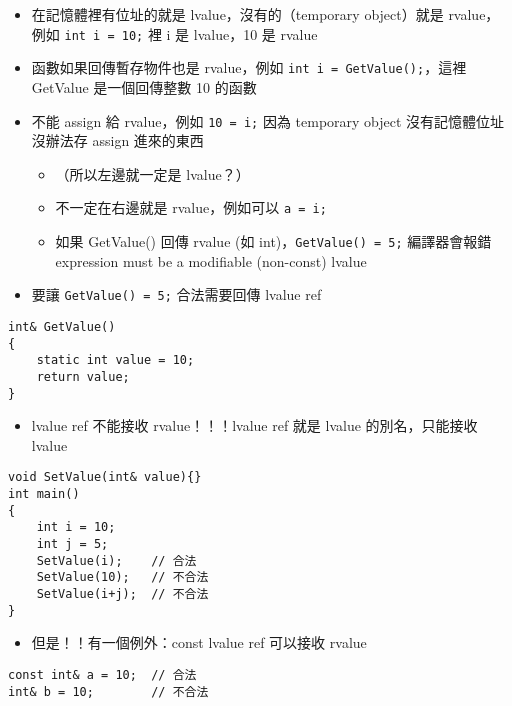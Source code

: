 \documentclass[11pt]{article}
\providecommand{\tightlist}{%
      \setlength{\itemsep}{0pt}\setlength{\parskip}{0pt}}
\begin{document}
\begin{itemize}
\tightlist
\item
  在記憶體裡有位址的就是 lvalue，沒有的（temporary object）就是
  rvalue，例如 \texttt{int\ i\ =\ 10;} 裡 i 是 lvalue，10 是 rvalue
\item
  函數如果回傳暫存物件也是 rvalue，例如
  \texttt{int\ i\ =\ GetValue();}，這裡 GetValue 是一個回傳整數 10
  的函數
\item
  不能 assign 給 rvalue，例如 \texttt{10\ =\ i;} 因為 temporary object
  沒有記憶體位址沒辦法存 assign 進來的東西

  \begin{itemize}
  \tightlist
  \item
    （所以左邊就一定是 lvalue？）
  \item
    不一定在右邊就是 rvalue，例如可以 \texttt{a\ =\ i;}
  \item
    如果 GetValue() 回傳 rvalue (如 int)，\texttt{GetValue()\ =\ 5;}
    編譯器會報錯 expression must be a modifiable (non-const) lvalue
  \end{itemize}
\item
  要讓 \texttt{GetValue()\ =\ 5;} 合法需要回傳 lvalue ref
\end{itemize}

\begin{verbatim}
int& GetValue()
{
    static int value = 10;
    return value;
}
\end{verbatim}

\begin{itemize}
\tightlist
\item
  lvalue ref 不能接收 rvalue！！！lvalue ref 就是 lvalue
  的別名，只能接收 lvalue
\end{itemize}

\begin{verbatim}
void SetValue(int& value){}
int main()
{
    int i = 10;
    int j = 5;
    SetValue(i);    // 合法
    SetValue(10);   // 不合法
    SetValue(i+j);  // 不合法
}
\end{verbatim}

\begin{itemize}
\tightlist
\item
  但是！！有一個例外：const lvalue ref 可以接收 rvalue
\end{itemize}

\begin{verbatim}
const int& a = 10;  // 合法
int& b = 10;        // 不合法
\end{verbatim}
\end{document}
